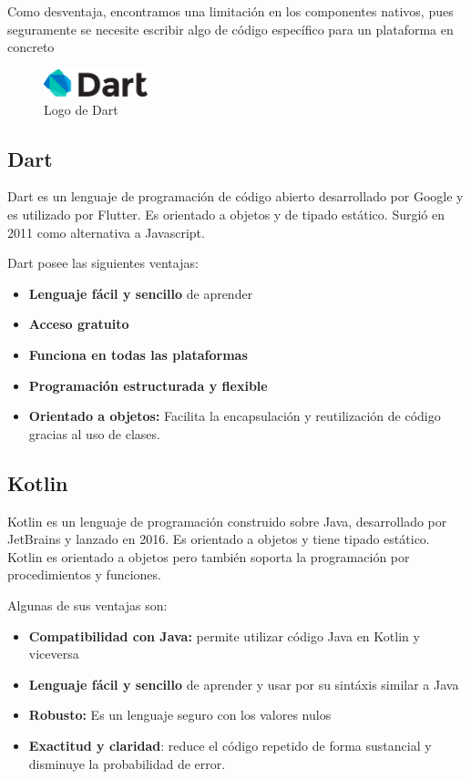 Como desventaja, encontramos una limitación en los componentes nativos, pues seguramente se necesite escribir algo de código
específico para un plataforma en concreto


\begin{figure}
    \vspace*{-0.4cm}

    \centering
    \includegraphics[width=0.27\textwidth]{imagenes/c2/dart.png}
    \caption{Logo de Dart}
\end{figure}\subsection{Dart}
Dart es un lenguaje de programación de código abierto desarrollado por Google y es utilizado por Flutter.
Es  orientado a objetos y de tipado estático. Surgió en 2011 como alternativa a Javascript.

Dart posee las siguientes ventajas:

\begin{itemize}
\item \textbf{Lenguaje fácil y sencillo} de aprender
\item \textbf{Acceso gratuito}
\item \textbf{Funciona en todas las plataformas}
\item \textbf{Programación estructurada y flexible}
\item \textbf{Orientado a objetos:} Facilita la encapsulación y reutilización de código gracias al uso de clases.
 
\end{itemize}

\subsection{Kotlin}
Kotlin es un lenguaje de programación construido sobre Java, desarrollado por JetBrains y lanzado en 2016.
Es orientado a objetos y tiene tipado estático. Kotlin es orientado a objetos pero también soporta la programación por procedimientos y funciones. 

Algunas de sus ventajas son:
\begin{itemize}
\item \textbf{Compatibilidad con Java:} permite utilizar código Java en Kotlin y viceversa
\item \textbf{Lenguaje fácil y sencillo} de aprender y usar por su sintáxis similar a Java
\item \textbf{Robusto:} Es un lenguaje seguro con los valores nulos 
\item \textbf{Exactitud y claridad}: reduce el código repetido de forma sustancial y disminuye la probabilidad de error.

\end{itemize}


